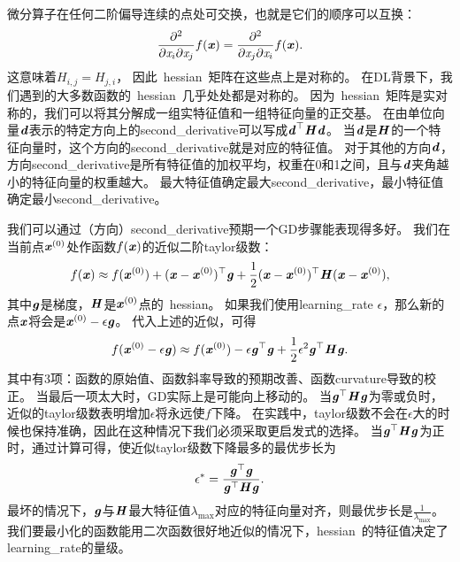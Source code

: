 微分算子在任何二阶偏导连续的点处可交换，也就是它们的顺序可以互换：
\begin{align}
 \frac{\partial^2}{\partial \Sx_i \partial \Sx_j} f(\Vx) = \frac{\partial^2}{\partial \Sx_j\partial \Sx_i} f(\Vx) .
\end{align}
这意味着$H_{i,j} = H_{j,i}$， 因此~\gls{hessian}~矩阵在这些点上是对称的。
在\gls{DL}背景下，我们遇到的大多数函数的~\gls{hessian}~几乎处处都是对称的。
因为~\gls{hessian}~矩阵是实对称的，我们可以将其分解成一组实特征值和一组特征向量的正交基。
在由单位向量$\Vd$表示的特定方向上的\gls{second_derivative}可以写成$\Vd^\Tsp \MH \Vd$。
当$\Vd$是$\MH$的一个特征向量时，这个方向的\gls{second_derivative}就是对应的特征值。
对于其他的方向$\Vd$，方向\gls{second_derivative}是所有特征值的加权平均，权重在0和1之间，且与$\Vd$夹角越小的特征向量的权重越大。
最大特征值确定最大\gls{second_derivative}，最小特征值确定最小\gls{second_derivative}。


我们可以通过（方向）\gls{second_derivative}预期一个\gls{GD}步骤能表现得多好。
我们在当前点$\Vx^{(0)}$处作函数$f(\Vx)$的近似二阶\gls{taylor}级数：
\begin{align}
 f(\Vx) \approx f(\Vx^{(0)}) + (\Vx - \Vx^{(0)})^\Tsp \Vg + 
 \frac{1}{2}  (\Vx - \Vx^{(0)})^\Tsp \MH  (\Vx - \Vx^{(0)}),
\end{align}
其中$\Vg$是梯度，$\MH$是$ \Vx^{(0)}$点的~\gls{hessian}。
如果我们使用\gls{learning_rate} $\epsilon$，那么新的点$\Vx$将会是$\Vx^{(0)}-\epsilon \Vg$。
代入上述的近似，可得
\begin{align}
\label{eq:4.9}
 f(\Vx^{(0)} - \epsilon \Vg ) \approx f(\Vx^{(0)})  - \epsilon \Vg^\Tsp \Vg + \frac{1}{2} \epsilon^2 \Vg^\Tsp \MH  \Vg.
\end{align}
其中有3项：函数的原始值、函数斜率导致的预期改善、函数\gls{curvature}导致的校正。
当最后一项太大时，\gls{GD}实际上是可能向上移动的。
当$\Vg^\Tsp \MH  \Vg$为零或负时，近似的\gls{taylor}级数表明增加$\epsilon$将永远使$f$下降。
在实践中，\gls{taylor}级数不会在$\epsilon$大的时候也保持准确，因此在这种情况下我们必须采取更启发式的选择。
当$\Vg^\Tsp \MH  \Vg$为正时，通过计算可得，使近似\gls{taylor}级数下降最多的最优步长为
\begin{align}
 \epsilon^* = \frac{ \Vg^\Tsp \Vg}{ \Vg^\Tsp \MH  \Vg} .
\end{align}
最坏的情况下，$\Vg$与$\MH$最大特征值$\lambda_{\max}$对应的特征向量对齐，则最优步长是$\frac{1}{\lambda_{\max}}$。
我们要最小化的函数能用二次函数很好地近似的情况下，\gls{hessian}~的特征值决定了\gls{learning_rate}的量级。

